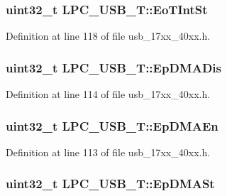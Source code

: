 \subsubsection[{\texorpdfstring{Eo\+T\+Int\+St}{EoTIntSt}}]{ uint32\+\_\+t L\+P\+C\+\_\+\+U\+S\+B\+\_\+\+T\+::\+Eo\+T\+Int\+St}\hypertarget{structLPC__USB__T_af483cc05257c600654f3e7fb5e394e7a}{}\label{structLPC__USB__T_af483cc05257c600654f3e7fb5e394e7a}


Definition at line 118 of file usb\+\_\+17xx\+\_\+40xx.\+h.

\subsubsection[{\texorpdfstring{Ep\+D\+M\+A\+Dis}{EpDMADis}}]{ uint32\+\_\+t L\+P\+C\+\_\+\+U\+S\+B\+\_\+\+T\+::\+Ep\+D\+M\+A\+Dis}\hypertarget{structLPC__USB__T_a2f8d8134309f314d5c39616d877f8001}{}\label{structLPC__USB__T_a2f8d8134309f314d5c39616d877f8001}


Definition at line 114 of file usb\+\_\+17xx\+\_\+40xx.\+h.

\subsubsection[{\texorpdfstring{Ep\+D\+M\+A\+En}{EpDMAEn}}]{ uint32\+\_\+t L\+P\+C\+\_\+\+U\+S\+B\+\_\+\+T\+::\+Ep\+D\+M\+A\+En}\hypertarget{structLPC__USB__T_a1c48a3112f0c3060da924ae77e6fa75c}{}\label{structLPC__USB__T_a1c48a3112f0c3060da924ae77e6fa75c}


Definition at line 113 of file usb\+\_\+17xx\+\_\+40xx.\+h.

\subsubsection[{\texorpdfstring{Ep\+D\+M\+A\+St}{EpDMASt}}]{ uint32\+\_\+t L\+P\+C\+\_\+\+U\+S\+B\+\_\+\+T\+::\+Ep\+D\+M\+A\+St}\hypertarget{structLPC__USB__T_a7dcfa03e4f72cc49f2e608adf8911303}{}\label{structLPC__USB__T_a7dcfa03e4f72cc49f2e608adf8911303}


